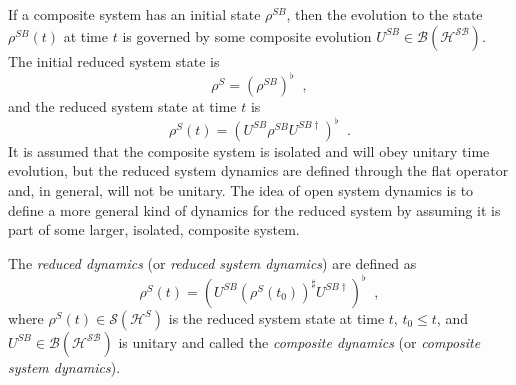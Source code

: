 If a composite system has an initial state $\rho^{SB}$, then the evolution to the state $\rho^{SB}(t)$ at time $t$ is governed by some composite evolution $U^{SB}\in\mathcal{B}(\mathcal{H^{SB}})$.  The initial reduced system state is
$$
\rho^S = (\rho^{SB})^\flat\;\;,
$$
and the reduced system state at time $t$ is
$$
\rho^S(t) = \left( U^{SB} \rho^{SB} U^{SB\dagger}\right)^\flat\;\;.
$$
It is assumed that the composite system is isolated and will obey unitary time evolution, but the reduced system dynamics are defined through the flat operator and, in general, will not be unitary.  The idea of open system dynamics is to define a more general kind of dynamics for the reduced system by assuming it is part of some larger, isolated, composite system.
\begin{definition}
The {\em reduced dynamics} (or {\em reduced system dynamics}) are defined as
\begin{equation}
\rho^S(t) = \left( U^{SB} \left(\rho^{S}(t_0)\right)^\sharp U^{SB\dagger}\right)^\flat\;\;,
\end{equation}
where $\rho^S(t)\in\mathcal{S}(\mathcal{H}^S)$ is the reduced system state at time $t$, $t_0\le t$, and $U^{SB}\in\mathcal{B}(\mathcal{H^{SB}})$ is unitary and called the {\em composite dynamics} (or {\em composite system dynamics}).
\end{definition}

